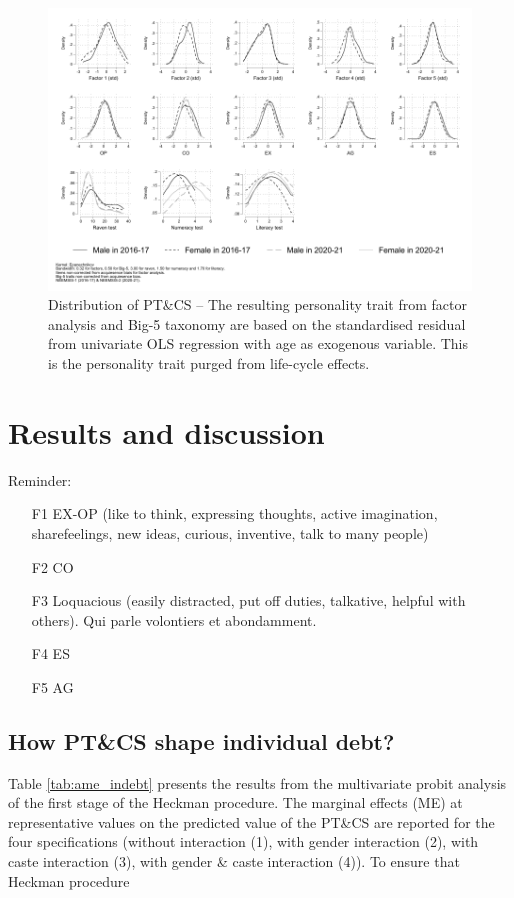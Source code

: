 \documentclass[a4paper, 11pt, onecolumn]{article}
\begin{document}
\begin{figure}[ht]
\raggedright
\includegraphics[width=\textwidth]{INPUT/Kernel_PTCS_raw_new}
\caption{Distribution of PT\&CS -- The resulting personality trait from factor analysis and Big-5 taxonomy are based on the standardised residual from univariate OLS regression with age as exogenous variable. This is the personality trait purged from life-cycle effects.}
\label{fig:PTCS}
\end{figure}



\newpage
\section{Results and discussion}

Reminder:
\begin{itemize}
\item[F1] EX-OP (like to think, expressing thoughts, active imagination, sharefeelings, new ideas, curious, inventive, talk to many people)
\item[F2] CO
\item[F3] Loquacious (easily distracted, put off duties, talkative, helpful with others). Qui parle volontiers et abondamment.
\item[F4] ES
\item[F5] AG
\end{itemize}

\subsection{How PT\&CS shape individual debt?}
Table \ref{tab:ame_indebt} presents the results from the multivariate probit analysis of the first stage of the Heckman procedure. 
The marginal effects (ME) at representative values on the predicted value of the PT\&CS are reported for the four specifications (without interaction (1), with gender interaction (2), with caste interaction (3), with gender \& caste interaction (4)).
To ensure that Heckman procedure 
\end{document}
